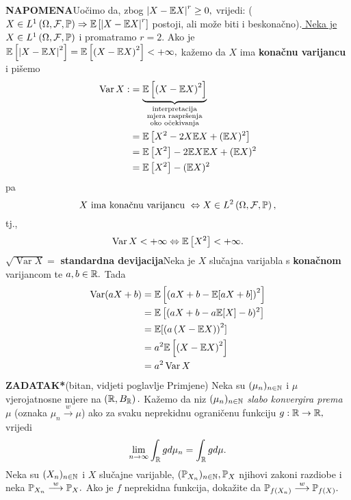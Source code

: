 \documentclass{article}
\newcommand{\Var}{\operatorname{Var}}
\begin{document}
\textbf{NAPOMENA}\newline Uočimo da, zbog \(\left|X-\Bbb EX\right|^r\ge 0,\) vrijedi: (\(X\in L^1\left(\Omega,\mathcal F,\Bbb P\right)\Rightarrow\Bbb E\left[\left|X-\Bbb EX\right|^r\right]\) postoji, ali može biti i beskonačno).\newline\newline\underline{ Neka je \(X\in L^1\left(\Omega,\mathcal F,\Bbb P\right)\)} i promatramo \(\boxed{r=2}.\) Ako je \(\Bbb E\left[\left|X-\Bbb EX\right|^2\right]=\Bbb E\left[\left(X-\Bbb EX\right)^2\right]<+\infty,\) kažemo da \(X\) ima \textbf{konačnu varijancu} i pišemo \[\begin{aligned}\Var X:&=\underbrace{\Bbb E\left[\left(X-\Bbb EX\right)^2\right]}_{\substack{\text{interpretacija}\\\text{mjera raspršenja}\\\text{oko očekivanja}}}\\&=\Bbb E\left[X^2-2X\Bbb EX+(\Bbb EX)^2\right]\\&=\Bbb E\left[X^2\right]-2\Bbb E X\Bbb EX+(\Bbb EX)^2\\&=\Bbb E\left[X^2\right]-(\Bbb EX)^2\end{aligned}\] pa \[X\text{ ima konačnu varijancu }\Leftrightarrow X\in L^2\left(\Omega,\mathcal F,\Bbb P\right),\] tj., \[\Var X<+\infty\Leftrightarrow\Bbb E\left[X^2\right]<+\infty.\] \(\sqrt{\Var X}=\) \textbf{standardna devijacija}\newline\newline Neka je \(X\) slučajna varijabla s \textbf{konačnom} varijancom te \(a,b\in\Bbb R.\) Tada \[\begin{aligned}\Var (aX+b)&=\Bbb E\left[\left(aX+b-\Bbb E[aX+b]\right)^2\right]\\&=\Bbb E\left[(aX+b-a\Bbb E[X]-b)^2\right]\\&=\Bbb E[\left(a\left(X-\Bbb EX\right)\right)^2]\\&=a^2\Bbb E\left[\left(X-\Bbb EX\right)^2\right]\\&=a^2\Var X\end{aligned}\]
\textbf{ZADATAK*}(bitan, vidjeti poglavlje \textsection Primjene)\newline
Neka su \((\mu_n)_{n\in\Bbb N}\) i \(\mu\) vjerojatnosne mjere na \(\left(\Bbb R,B_\Bbb R\right).\) Kažemo da niz \((\mu_n)_{n\in\Bbb N}\) \emph{slabo konvergira prema} \(\mu\) (oznaka \(\mu_n\overset{w}{\longrightarrow}\mu\)) ako za svaku neprekidnu ograničenu funkciju \(g:\Bbb R\to\Bbb R,\) vrijedi \[\lim_{n\to\infty}\int_\Bbb Rgd\mu_n=\int_\Bbb Rgd\mu.\] Neka su \((X_n)_{n\in\Bbb N}\) i \(X\) slučajne varijable, \((\Bbb P_{X_n})_{n\in\Bbb N},\Bbb P_X\) njihovi zakoni razdiobe i neka \(\Bbb P_{X_n}\overset{w}{\longrightarrow}\Bbb P_X.\) Ako je \(f\) neprekidna funkcija, dokažite da \(\Bbb P_{f(X_n)}\overset{w}{\longrightarrow}\Bbb P_{f(X)}.\)\newline\newline
\end{document}
